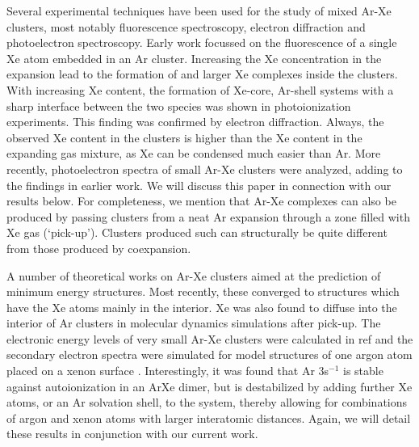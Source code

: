 Several experimental techniques have been used for the study of mixed Ar-Xe clusters, most notably fluorescence spectroscopy, electron diffraction and photoelectron spectroscopy. 
Early work focussed on the fluorescence of a single Xe atom 
embedded in an Ar cluster.\cite{lengenprl}
Increasing the Xe concentration in the expansion lead to the formation of  and larger Xe complexes inside the clusters.\cite{lengen} 
With increasing Xe content, the formation of Xe-core, Ar-shell systems with a sharp interface between the two species was shown in photoionization experiments.\cite{tchaplyguine,hoener}
This finding was confirmed by electron diffraction.\cite{Danylchenko,Danylchenko07} 
Always, the observed Xe content in the clusters is higher than the Xe content in the expanding gas mixture, as Xe can be condensed much easier than Ar.\cite{hoener,Danylchenko07}
%
More recently, photoelectron spectra of 
small Ar-Xe clusters were analyzed, adding to the findings in 
earlier work.\cite{lindblad} We will discuss this paper in 
connection with our results below. 
For completeness, we mention that Ar-Xe complexes can also be produced by passing clusters from a neat Ar expansion through a zone filled with Xe gas (`pick-up').\cite{pietrowski}
Clusters produced such can structurally be quite different from those produced by coexpansion.\cite{lindbladpccp}

A number of theoretical works on Ar-Xe clusters aimed at the prediction of minimum energy structures. 
Most recently, these converged to structures which have the Xe atoms mainly in the interior.\cite{marques} 
Xe was also found to diffuse into the interior of Ar clusters in molecular dynamics simulations after pick-up.\cite{Vach_1999} 
The electronic energy levels of very small Ar-Xe clusters were calculated in ref  and the secondary electron spectra were simulated for
model structures of one argon atom placed on a xenon surface \cite{Fasshauer13}.
Interestingly, it was found that Ar 3s$^{-1}$ is stable 
against autoionization in an ArXe dimer, but is destabilized by 
adding further Xe atoms, or an Ar solvation shell, to the system, thereby allowing
for combinations of argon and xenon atoms with larger interatomic distances. 
Again, we will detail these results in conjunction with our 
current work.

